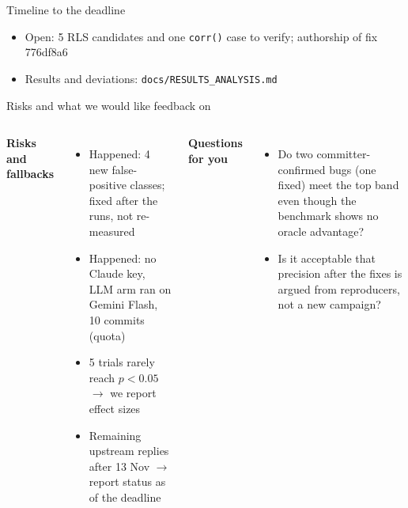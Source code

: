 \documentclass[aspectratio=169,11pt]{beamer}
\begin{document}
\begin{frame}{Timeline to the deadline}
\begin{center}
\end{center}
\small
\begin{itemize}
  \item Open: 5 RLS candidates and one \texttt{corr()} case to verify; authorship of fix 776df8a6
  \item Results and deviations: \texttt{docs/RESULTS\_ANALYSIS.md}
\end{itemize}
\end{frame}

\begin{frame}{Risks and what we would like feedback on}
\begin{columns}[T]
\textbf{Risks and fallbacks}
\small
\begin{itemize}
  \item Happened: 4 new false-positive classes; fixed after the runs, not re-measured
  \item Happened: no Claude key, LLM arm ran on Gemini Flash, 10 commits (quota)
  \item 5 trials rarely reach $p<0.05$ $\rightarrow$ we report effect sizes
  \item Remaining upstream replies after 13 Nov $\rightarrow$ report status as of the deadline
\end{itemize}
\textbf{Questions for you}
\small
\begin{itemize}
  \item Do two committer-confirmed bugs (one fixed) meet the top band even though the benchmark shows no oracle advantage?
  \item Is it acceptable that precision after the fixes is argued from reproducers, not a new campaign?
\end{itemize}
\end{columns}
\end{frame}
\end{document}
